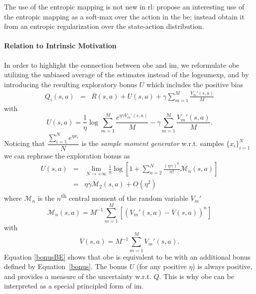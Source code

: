 The use of the entropic mapping is not new in \gls{rl}: \cite{pmlr-v70-asadi17a} propose an interesting use of the entropic mapping as a soft-max over the action in the \gls{be}; \cite{peters2010relative} instead obtain it from an entropic regularization over the state-action distribution.

\paragraph{Relation to Intrinsic Motivation}
In order to highlight the connection between \gls{obe} and \gls{im}, we reformulate \gls{obe} utilizing the unbiased average of the estimates instead of the logsumexp, and by introducing the resulting exploratory bonus $U$ which includes the positive bias
\begin{eqnarray}
Q_i(s,a)\! &=&\! \overline{R}(s,a) + U(s,a) +  \gamma  \sum_{m=1}^M \frac{V_m'(s,a)}{M} \label{bonusBE}
\end{eqnarray}
with
\begin{equation}
U(s,a) \! =\!  \frac{1}{\eta}\log\sum_{m=1}^M \frac{e^{\eta\gamma V_m'(s,a)}}{M} - \gamma  \sum_{m=1}^M \frac{V_m'(s,a)}{M}. \label{bonusdef}
\end{equation}
Noticing that $\dfrac{\sum_{i=1}^N e^{\eta x_i}}{N}$ is the \textit{sample moment generator} w.r.t. samples $\{x_i\}_{i=1}^N$ we can rephrase the exploration bonus as
\begin{eqnarray}
U(s,a)& = & \lim_{N \to +\infty}\frac{1}{\eta} \log [  1 + \sum_{n=2}^{N} \frac{(\eta\gamma)^n}{n!}\mathcal{M}_n(s,a)] \nonumber \\
& = & \eta \gamma \mathcal{M}_2(s,a)  + O(\eta^2)\label{bonus}
\end{eqnarray}
where $\mathcal{M}_n$ is the $n$\textsuperscript{th} central moment of the random variable $V_m'$
\begin{equation}
\mathcal{M}_n(s,a) = M^{-1} \sum_{m=1}^M [( V_m'(s,a) -\overline{V}(s,a))^n]\nonumber
\end{equation}
with 
\begin{equation}
\overline{V}(s,a) = M^{-1} \sum_{m=1}^M V_m'(s,a).\nonumber
\end{equation}
Equation \eqref{bonusBE} shows that \gls{obe} is equivalent to \gls{be} with an additional bonus defined by Equation~\ref{bonus}. The bonus $U$ (for any positive $\eta$) is always positive, and provides a measure of the uncertainty w.r.t. $Q$. This is why \gls{obe} can be interpreted as a special principled form of \gls{im}.

